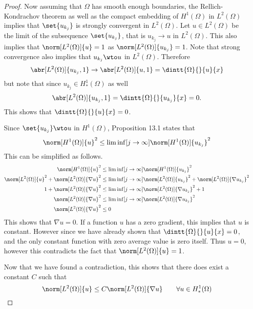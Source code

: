 \documentclass[11pt, oneside]{article}
\begin{document}
\begin{enumerate}
\begin{proof}
      Now assuming that $\Omega$ has smooth enough boundaries, the
      Rellich-Kondrachov theorem as well as the compact embedding of
      $H^1(\Omega)$ in $L^2(\Omega)$ implies that $\set{u_{k_j}}$ is strongly
      convergent in $L^2(\Omega)$.
      Let $u \in L^2(\Omega)$ be the limit of the subsequence $\set{u_{k_j}}$, that is
      $u_{k_j} \to u$ in $L^2(\Omega)$.
      This also implies that $\norm[L^2(\Omega)]{u} = 1$ as
      $\norm[L^2(\Omega)]{u_{k_j}} = 1$.
      Note that strong convergence also implies that $u_{k_j} \wto u$ in
      $L^2(\Omega)$.
      Therefore
      \[
        \abr[L^2(\Omega)]{u_{k_j}, 1} \to \abr[L^2(\Omega)]{u, 1} = \dintt{\Omega}{}{u}{x}
      \]
      but note that since $u_{k_j} \in H^1_*(\Omega)$ as well
      \[
        \abr[L^2(\Omega)]{u_{k_j}, 1} = \dintt{\Omega}{}{u_{k_j}}{x} = 0.
      \]
      This shows that $\dintt{\Omega}{}{u}{x} = 0$.

      Since $\set{u_{k_j}} \wto u$ in $H^1(\Omega)$, Proposition 13.1 states
      that
      \[
        \norm[H^1(\Omega)]{u}^2 \le \liminf[j \to \infty]{\norm[H^1(\Omega)]{u_{k_j}}^2}
      \]
      This can be simplified as follows.
      \begin{align*}
        \norm[H^1(\Omega)]{u}^2 &\le \liminf[j \to \infty]{\norm[H^1(\Omega)]{u_{k_j}}^2} \\
        \norm[L^2(\Omega)]{u}^2 + \norm[L^2(\Omega)]{\nabla u}^2 &\le \liminf[j \to \infty]{\norm[L^2(\Omega)]{u_{k_j}}^2 + \norm[L^2(\Omega)]{\nabla u_{k_j}}^2} \\
        1 + \norm[L^2(\Omega)]{\nabla u}^2 &\le \liminf[j \to \infty]{\norm[L^2(\Omega)]{\nabla u_{k_j}}^2} + 1 \\
        \norm[L^2(\Omega)]{\nabla u}^2 &\le \liminf[j \to \infty]{\norm[L^2(\Omega)]{\nabla u_{k_j}}^2} \\
        \norm[L^2(\Omega)]{\nabla u}^2 &\le 0 \\
      \end{align*}
      This shows that $\nabla u = 0$.
      If a function $u$ has a zero gradient, this implies that $u$ is constant.
      However since we have already shown that $\dintt{\Omega}{}{u}{x} = 0$, and
      the only constant function with zero average value is zero itself.
      Thus $u = 0$, however this contradicts the fact that
      $\norm[L^2(\Omega)]{u} = 1$.

      Now that we have found a contradiction, this shows that there does exist
      a constant $C$ such that
      \[
        \norm[L^2(\Omega)]{u} \le C \norm[L^2(\Omega)]{\nabla u} \qquad \forall u \in H^1_*(\Omega)
      \]
    \end{proof}


\end{enumerate}
\end{document}
